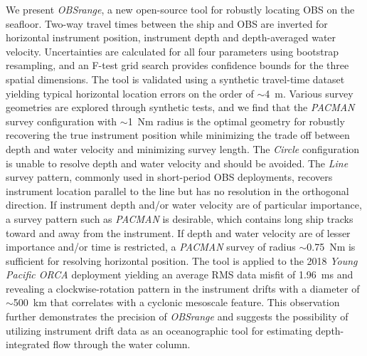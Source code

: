 We present \textit{OBSrange}, a new open-source tool for robustly locating OBS on the seafloor. Two-way travel times between the ship and OBS are inverted for horizontal instrument position, instrument depth and depth-averaged water velocity. Uncertainties are calculated for all four parameters using bootstrap resampling, and an F-test grid search provides confidence bounds for the three spatial dimensions. The tool is validated using a synthetic travel-time dataset yielding typical horizontal location errors on the order of $\sim$4~m. Various survey geometries are explored through synthetic tests, and we find that the \textit{PACMAN} survey configuration with $\sim$1~Nm radius is the optimal geometry for robustly recovering the true instrument position while minimizing the trade off between depth and water velocity and minimizing survey length. The \textit{Circle} configuration is unable to resolve depth and water velocity and should be avoided. The \textit{Line} survey pattern, commonly used in short-period OBS deployments, recovers instrument location parallel to the line but has no resolution in the orthogonal direction. If instrument depth and/or water velocity are of particular importance, a survey pattern such as \textit{PACMAN} is desirable, which contains long ship tracks toward and away from the instrument. If depth and water velocity are of lesser importance and/or time is restricted, a \textit{PACMAN} survey of radius $\sim$0.75~Nm is sufficient for resolving horizontal position. The tool is applied to the 2018 \textit{Young Pacific ORCA} deployment yielding an average RMS data misfit of 1.96~ms and revealing a clockwise-rotation pattern in the instrument drifts with a diameter of $\sim$500~km that correlates with a cyclonic mesoscale feature. This observation further demonstrates the precision of \textit{OBSrange} and suggests the possibility of utilizing instrument drift data as an oceanographic tool for estimating depth-integrated flow through the water column.



